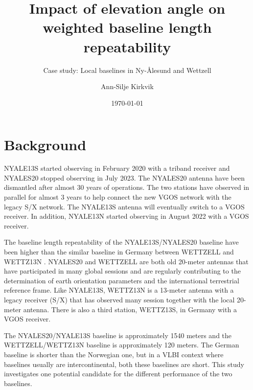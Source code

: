 \documentclass[twoside=semi,fontsize=12pt,paper=a4,titlepage=on]{kv_article}
\begin{document}
\title{Impact of elevation angle on weighted baseline length repeatability}
\subtitle{\vspace{1cm}Case study: Local baselines in Ny-Ålesund and Wettzell}
\author{Ann-Silje Kirkvik}
\date{\today}

\maketitle

\section{Background}
NYALE13S started observing in February 2020 with a triband receiver and NYALES20 stopped observing in July 2023. The NYALES20 antenna have been dismantled after almost 30 years of operations. The two stations have observed in parallel for almost 3 years to help connect the new VGOS network with the legacy S/X network. The NYALE13S antenna will eventually switch to a VGOS receiver. In addition, NYALE13N started observing in August 2022 with a VGOS receiver.

The baseline length repeatability of the NYALE13S/NYALES20 baseline have been higher than the similar baseline in Germany between WETTZELL and WETTZ13N \cite{kirkvik2021}. NYALES20 and WETTZELL are both old 20-meter antennas that have participated in many global sessions and are regularly contributing to the determination of earth orientation parameters and the international terrestrial reference frame. Like NYALE13S, WETTZ13N is a 13-meter antenna with a legacy receiver (S/X) that has observed many session together with the local 20-meter antenna. There is also a third station, WETTZ13S, in Germany with a VGOS receiver.

\sloppy
The NYALES20/NYALE13S baseline is approximately 1540 meters and the WETTZELL/WETTZ13N baseline is approximately 120 meters. The German baseline is shorter than the Norwegian one, but in a VLBI context where baselines usually are intercontinental, both these baselines are short. This study investigates one potential candidate for the different performance of the two baselines.
\end{document}
